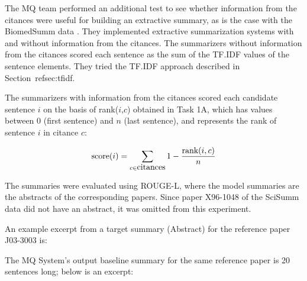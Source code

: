 \documentclass[11pt]{article}
\begin{document}
The MQ team performed an additional test to see whether information
from the citances were useful for building an extractive summary, as
is the case with the BiomedSumm data \cite{Molla:ALTA2014}. They
implemented extractive summarization systems with and without
information from the citances.  The summarizers without information
from the citances scored each sentence as the sum of the TF.IDF values
of the sentence elements. They tried the TF.IDF approach described in
Section~ref{sec:tfidf}.

The summarizers with information from the citances scored each candidate 
sentence $i$ on the basis of rank($i$,$c$) obtained in Task 1A, which has 
values between 0 (first sentence) and $n$ (last sentence), and represents 
the rank of sentence $i$ in citance $c$:

$$
\hbox{score}(i) = \sum_{c\in\hbox{citances}}1-\frac{\hbox{rank}(i,c)}{n}
$$

The summaries were evaluated using ROUGE-L, where the model summaries are 
the abstracts of the corresponding papers. Since paper X96-1048 of 
the SciSumm data did not have an abstract, it was omitted from this 
experiment.

An example excerpt from a target summary (Abstract) for the reference 
paper J03-3003 is:

\noindent{}

The MQ System's output baseline summary for the same reference paper is 20 
sentences long; below is an excerpt:
\end{document}
